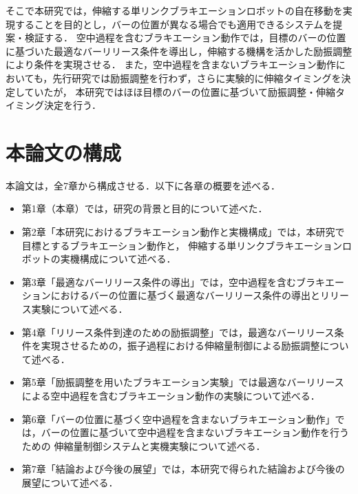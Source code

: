           そこで本研究では，伸縮する単リンクブラキエーションロボットの自在移動を実現することを目的とし，バーの位置が異なる場合でも適用できるシステムを提案・検証する．
          空中過程を含むブラキエーション動作では，目標のバーの位置に基づいた最適なバーリリース条件を導出し，伸縮する機構を活かした励振調整により条件を実現させる．
          また，空中過程を含まないブラキエーション動作においても，先行研究では励振調整を行わず，さらに実験的に伸縮タイミングを決定していたが\cite{Hijiri:Robomech2024}，
          本研究ではほほ目標のバーの位置に基づいて励振調整・伸縮タイミング決定を行う．
          
        \section{本論文の構成}

          本論文は，全7章から構成させる．以下に各章の概要を述べる．
          \begin{itemize}
            \item 第1章（本章）では，研究の背景と目的について述べた．
            \item 第2章「本研究におけるブラキエーション動作と実機構成」では，本研究で目標とするブラキエーション動作と，
            伸縮する単リンクブラキエーションロボットの実機構成について述べる．
            \item 第3章「最適なバーリリース条件の導出」では，空中過程を含むブラキエーションにおけるバーの位置に基づく最適なバーリリース条件の導出とリリース実験について述べる．
            \item 第4章「リリース条件到達のための励振調整」では，最適なバーリリース条件を実現させるための，振子過程における伸縮量制御による励振調整について述べる．
            \item 第5章「励振調整を用いたブラキエーション実験」では最適なバーリリースによる空中過程を含むブラキエーション動作の実験について述べる．
            \item 第6章「バーの位置に基づく空中過程を含まないブラキエーション動作」では，バーの位置に基づいて空中過程を含まないブラキエーション動作を行うための
            伸縮量制御システムと実機実験について述べる．
            \item 第7章「結論および今後の展望」では，本研究で得られた結論および今後の展望について述べる．
          \end{itemize}

